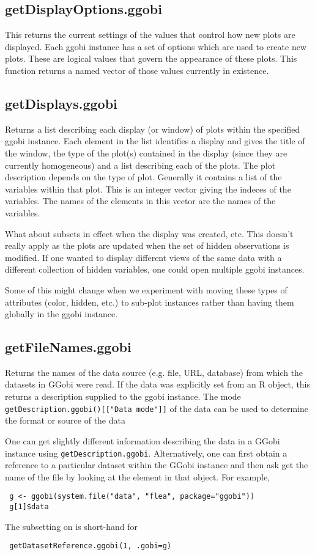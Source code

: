 \documentclass{article}
\def\SFunction#1{{\texttt{\red #1}}}
\begin{document}
\subsection{getDisplayOptions.ggobi}
This returns the current settings of the values that control how new
plots are displayed.  Each ggobi instance has a set of options which
are used to create new plots.  These are logical values that govern
the appearance of these plots.  This function returns a named vector
of those values currently in existence.

\subsection{getDisplays.ggobi}
Returns a list describing each display (or window) of plots within the
specified ggobi instance.  Each element in the list identifies a
display and gives the title of the window, the type of the plot(s)
contained in the display (since they are currently homogeneous) and a
list describing each of the plots.  The plot description depends on
the type of plot. Generally it contains a list of the variables within
that plot.  This is an integer vector giving the indeces of the
variables. The names of the elements in this vector are the names of
the variables. 

What about subsets in effect when the display was created, etc.  This
doesn't really apply as the plots are updated when the set of hidden
observations is modified.  If one wanted to display different views of
the same data with a different collection of hidden variables, one
could open multiple ggobi instances.

Some of this might change when we experiment with moving these types
of attributes (color, hidden, etc.) to sub-plot instances rather than
having them globally in the ggobi instance.

\subsection{getFileNames.ggobi}
Returns the names of the data source (e.g. file, URL, database) from
which the datasets in GGobi were read. If the data was explicitly set
from an R object, this returns a description supplied to the ggobi
instance.  The mode \SFunction{getDescription.ggobi()[["Data mode"]]}
of the data can be used to determine the format or source of the data

One can get slightly different information describing the data in a
GGobi instance using \SFunction{getDescription.ggobi}.  Alternatively,
one can first obtain a reference to a particular dataset within the
GGobi instance and then ask get the name of the file
by looking at the  element in that object.
For example,
\begin{verbatim}
 g <- ggobi(system.file("data", "flea", package="ggobi"))
 g[1]$data     
\end{verbatim}
The subsetting on  
is short-hand for 
\begin{verbatim}
 getDatasetReference.ggobi(1, .gobi=g)
\end{verbatim}%
\end{document}
